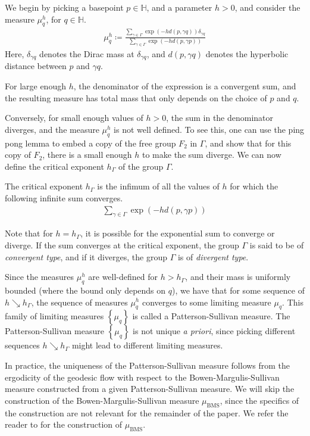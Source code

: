 We begin by picking a basepoint $p \in \mathbb{H}$, and a parameter $h > 0$, and consider the measure $\mu_q^h$, for $q \in \mathbb{H}$.
\begin{align*}
  \mu_q^h \coloneqq \frac{\sum_{\gamma \in \Gamma} \exp(-h d(p, \gamma q)) \delta_{\gamma q}}{\sum_{\gamma \in \Gamma} \exp(-h d(p, \gamma p))}
\end{align*}
Here, $\delta_{\gamma q}$ denotes the Dirac mass at $\delta_{\gamma q}$, and $d(p, \gamma q)$ denotes the hyperbolic distance between $p$ and $\gamma q$.

For large enough $h$, the denominator of the expression is a convergent sum, and the resulting measure has total mass that only depends on the choice of $p$ and $q$.

Conversely, for small enough values of $h > 0$, the sum in the denominator diverges, and the measure $\mu_q^h$ is not well defined.
To see this, one can use the ping pong lemma to embed a copy of the free group $F_2$ in $\Gamma$, and show that for this copy of $F_2$, there is a small enough $h$ to make the sum diverge.
We can now define the critical exponent $h_{\Gamma}$ of the group $\Gamma$.
\begin{definition}
  The critical exponent $h_{\Gamma}$ is the infimum of all the values of $h$ for which the following infinite sum converges.
  \begin{align*}
    \sum_{\gamma \in \Gamma} \exp(-h d(p, \gamma p))
  \end{align*}
\end{definition}

Note that for $h = h_{\Gamma}$, it is possible for the exponential sum to converge or diverge.
If the sum converges at the critical exponent, the group $\Gamma$ is said to be of \emph{convergent type}, and if it diverges, the group $\Gamma$ is of \emph{divergent type}.

Since the measures $\mu_q^h$ are well-defined for $h > h_{\Gamma}$, and their mass is uniformly bounded (where the bound only depends on $q$), we have that for some sequence of $h \searrow h_{\Gamma}$, the sequence of measures $\mu_q^h$ converges to some limiting measure $\mu_q$.
This family of limiting measures $\left\{ \mu_q \right\}$ is called a Patterson-Sullivan measure.
The Patterson-Sullivan measure $\left\{ \mu_q \right\}$ is not unique \emph{a priori}, since picking different sequences $h \searrow h_{\Gamma}$ might lead to different limiting measures.

In practice, the uniqueness of the Patterson-Sullivan measure follows from the ergodicity of the geodesic flow with respect to the Bowen-Margulis-Sullivan measure constructed from a given Patterson-Sullivan measure.
We will skip the construction of the Bowen-Margulis-Sullivan measure $\mu_{\mathrm{BMS}}$, since the specifics of the construction are not relevant for the remainder of the paper.
We refer the reader to \textcite{quint2006overview} for the construction of $\mu_{\mathrm{BMS}}$.

